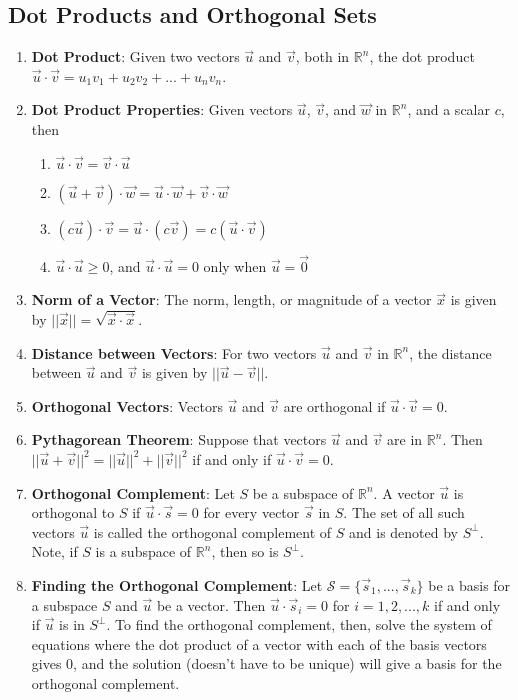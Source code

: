 \documentclass[10pt]{article}
\begin{document}
\subsection{Dot Products and Orthogonal Sets}
\begin{enumerate}
\item \textbf{Dot Product}: Given two vectors $\vec{u}$ and $\vec{v}$, both in $\mathbb{R}^n$, the dot product $\vec{u} \cdot \vec{v} = u_1v_1 + u_2v_2 + ... + u_nv_n$.
\item \textbf{Dot Product Properties}: Given vectors $\vec{u}$, $\vec{v}$, and $\vec{w}$ in $\mathbb{R}^n$, and a scalar $c$, then 
\begin{enumerate}
\item $\vec{u} \cdot \vec{v} = \vec{v} \cdot \vec{u}$
\item $(\vec{u} + \vec{v}) \cdot \vec{w} = \vec{u} \cdot \vec{w} + \vec{v} \cdot \vec{w}$
\item $(c\vec{u}) \cdot \vec{v} = \vec{u} \cdot (c\vec{v}) = c(\vec{u} \cdot \vec{v})$
\item $\vec{u} \cdot \vec{u} \geq 0$, and $\vec{u} \cdot \vec{u} = 0$ only when $\vec{u} = \vec{0}$
\end{enumerate}
\item \textbf{Norm of a Vector}: The norm, length, or magnitude of a vector $\vec{x}$ is given by $||\vec{x}|| = \sqrt{\vec{x} \cdot \vec{x}}$.
\item \textbf{Distance between Vectors}: For two vectors $\vec{u}$ and $\vec{v}$ in $\mathbb{R}^n$, the distance between $\vec{u}$ and $\vec{v}$ is given by $||\vec{u} - \vec{v}||$.
\item \textbf{Orthogonal Vectors}: Vectors $\vec{u}$ and $\vec{v}$ are orthogonal if $\vec{u} \cdot \vec{v} = 0$.
\item \textbf{Pythagorean Theorem}: Suppose that vectors $\vec{u}$ and $\vec{v}$ are in $\mathbb{R}^n$. Then $||\vec{u} + \vec{v}||^2 = ||\vec{u}||^2 + ||\vec{v}||^2$ if and only if $\vec{u} \cdot \vec{v} = 0$.
\item \textbf{Orthogonal Complement}: Let $S$ be a subspace of $\mathbb{R}^n$. A vector $\vec{u}$ is orthogonal to $S$ if $\vec{u} \cdot \vec{s} = 0$ for every vector $\vec{s}$ in $S$. The set of all such vectors $\vec{u}$ is called the orthogonal complement of $S$ and is denoted by $S^\perp$. Note, if $S$ is a subspace of $\mathbb{R}^n$, then so is $S^\perp$.
\item \textbf{Finding the Orthogonal Complement}: Let $\mathcal{S} = \lbrace \vec{s}_1,...,\vec{s}_k \rbrace$ be a basis for a subspace $S$ and $\vec{u}$ be a vector. Then $\vec{u} \cdot \vec{s}_i = 0$ for $i = 1,2,...,k$ if and only if $\vec{u}$ is in $S^\perp$. To find the orthogonal complement, then, solve the system of equations where the dot product of a vector with each of the basis vectors gives 0, and the solution (doesn't have to be unique) will give a basis for the orthogonal complement.

\end{enumerate}
\end{document}
